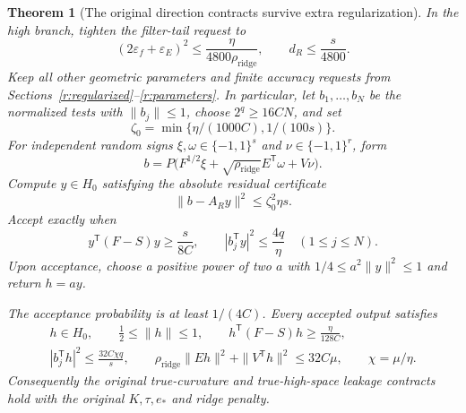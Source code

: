\documentclass[11pt]{amsart}
\newtheorem{theorem}{Theorem}[section]
\theoremstyle{definition}\newtheorem{definition}[theorem]{Definition}
\theoremstyle{remark}\newtheorem{remark}[theorem]{Remark}
\numberwithin{equation}{section}
\begin{document}
\begin{theorem}[The original direction contracts survive extra regularization]
\label{reg:sampler}
In the high branch, tighten the filter-tail request to
\begin{equation}\label{reg:budgets}
 (2\varepsilon_f+\varepsilon_E)^2
       \le\frac{\eta}{4800\rho_{\mathrm{ridge}}},
 \qquad d_R\le\frac{s}{4800}.
\end{equation}
Keep all other geometric parameters and finite accuracy requests from
Sections~\ref{r:regularized}--\ref{r:parameters}.  In particular, let
$b_1,\ldots,b_N$ be the normalized tests with $\|b_j\|\le1$, choose
$2^q\ge16CN$, and set
\[
 \zeta_0=\min\{\eta/(1000C),1/(100s)\}.
\]
For independent random signs
$\xi,\omega\in\{-1,1\}^s$ and $\nu\in\{-1,1\}^r$, form
\begin{equation}\label{reg:rhs}
 b=P\bigl(F^{1/2}\xi+
       \sqrt{\rho_{\mathrm{ridge}}}E^{\mathsf T}\omega+V\nu\bigr).
\end{equation}
Compute $y\in H_0$ satisfying the absolute residual certificate
\begin{equation}\label{reg:residual}
 \|b-A_Ry\|^2\le\zeta_0^2\eta s.
\end{equation}
Accept exactly when
\begin{equation}\label{reg:accept}
 y^{\mathsf T}(F-S)y\ge\frac{s}{8C},\qquad
 |b_j^{\mathsf T}y|^2\le\frac{4q}{\eta}\quad(1\le j\le N).
\end{equation}
Upon acceptance, choose a positive power of two $a$ with
$1/4\le a^2\|y\|^2\le1$ and return $h=ay$.

The acceptance probability is at least $1/(4C)$.  Every accepted output
satisfies
\begin{gather}
 h\in H_0,\qquad \tfrac12\le\|h\|\le1,
 \qquad h^{\mathsf T}(F-S)h\ge\frac{\eta}{128C},
 \label{reg:curvature}\\
 |b_j^{\mathsf T}h|^2\le\frac{32C\chi q}{s},\qquad
 \rho_{\mathrm{ridge}}\|Eh\|^2+\|V^{\mathsf T}h\|^2
       \le32C\mu,
 \qquad \chi=\mu/\eta.
 \label{reg:contracts}
\end{gather}
Consequently the original true-curvature and true-high-space leakage
contracts hold with the original $K,\tau,e_*$ and ridge penalty.
\end{theorem}
\end{document}
